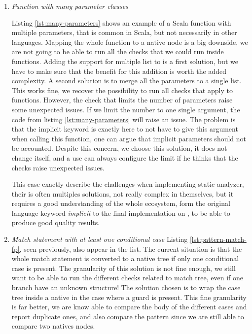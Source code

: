\begin{enumerate}
	\item \textit{Function with many parameter clauses} \newline 
	
	
	Listing \ref{lst:many-parameters} shows an example of a Scala function with multiple parameters, that is common in Scala, but not necessarily in other languages. 
	Mapping the whole function to a native node is a big downside, we are not going to be able to run all the checks that we could run inside functions.
	Adding the support for multiple list to \slang{} is a first solution, but we have to make sure that the benefit for this addition is worth the added complexity.
	A second solution is to merge all the parameters to a single list.
	This works fine, we recover the possibility to run all checks that apply to functions.
	However, the check that limits the number of parameters raise some unexpected issues.
	If we limit the number to one single argument, the code from listing \ref{lst:many-parameters} will raise an issue.
	The problem is that the implicit keyword is exactly here to not have to give this argument when calling this function, one can argue that implicit parameters should not be accounted.
	Despite this concern, we choose this solution, it does not change \slang{} itself, and a use can always configure the limit if he thinks that the checks raise unexpected issues.
	
	This case exactly describe the challenges when implementing static analyzer, their is often multiples solutions, not really complex in themselves, but it requires a good understanding of the whole ecosystem, form the original language keyword \emph{implicit} to the final implementation on \slang{}, to be able to produce good quality results.
	
	\item \textit{Match statement with at least one conditional case} \newline 
	Listing \ref{lst:pattern-match-fp}, seen previously, also appear in the list. The current situation is that the whole match statement is converted to a native tree if only one conditional case is present. 
	The granularity of this solution is not fine enough, we still want to be able to run the different checks related to match tree, even if one branch have an unknown structure!
	The solution chosen is to wrap the case tree inside a native in the case where a guard is present.
	This fine granularity is far better, we are know able to compare the body of the different cases and report duplicate ones, and also compare the pattern since we are still able to compare two natives nodes.
	

\end{enumerate}
